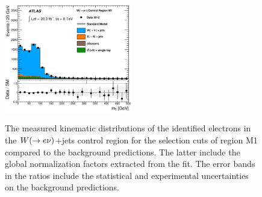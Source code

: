 \begin{figure}[!ht]
\begin{center}
{      \includegraphics[width=0.495\textwidth]{MonojetAnalysis/Figures/plot_Stop_A6_CRele_e_MT_fitted.eps}
    }
  \end{center}
  \caption[Kinematic distributions of the identified electrons in the $\wen$+jets control region for the selection cuts of region M1, after the normalization factors extracted from the fit have been applied.]{The measured kinematic distributions of the identified electrons in the $\wen$+jets control region for the selection cuts of region M1 compared to the background predictions. The latter include the global normalization factors extracted from the fit. The error bands in the ratios include the statistical and experimental uncertainties on the background predictions.}
  \label{fig:Plot_M1_CRele_Leptonkinematics}
\end{figure}

